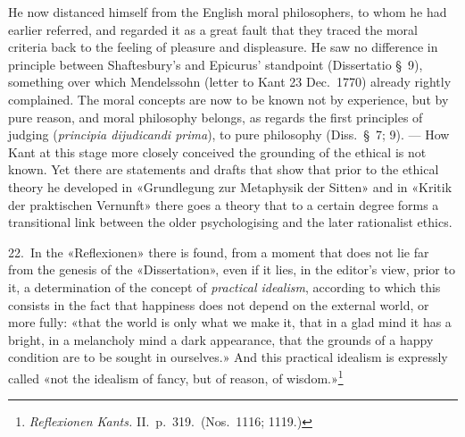 \documentclass[12pt,a4paper]{article}
\newcommand{\opage}[1]{\marginnote{\footnotesize\textit{[#1]}}}
\begin{document}
He now distanced himself from the English moral philosophers, to whom he had
earlier referred, and regarded it as a great fault that they traced the
moral criteria back to the feeling of pleasure and displeasure. He saw no
difference in principle between Shaftesbury's and Epicurus' standpoint
(Dissertatio §\ 9), something over which Mendelssohn (letter to Kant 23
Dec.\ 1770) already rightly complained. The moral concepts are now to be
known not \opage{42}by experience, but by pure reason, and moral philosophy belongs,
as regards the first principles of judging (\textit{principia dijudicandi
prima}), to pure philosophy (Diss.\ §\ 7; 9). --- How Kant at this stage
more closely conceived the grounding of the ethical is not known. Yet there
are statements and drafts that show that prior to the ethical theory he
developed in «Grundlegung zur Metaphysik der Sitten» and in «Kritik der
praktischen Vernunft» there goes a theory that to a certain degree forms a
transitional link between the older psychologising and the later
rationalist ethics.

22.\ In the «Reflexionen» there is found, from a moment that does not lie far
from the genesis of the «Dissertation», even if it lies, in the editor's
view, prior to it, a determination of the concept of \emph{practical idealism},
according to which this consists in the fact that happiness does not depend
on the external world, or more fully: «that the world is only what we make
it, that in a glad mind it has a bright, in a melancholy mind a dark
appearance, that the grounds of a happy condition are to be sought in
ourselves.» And this practical idealism is expressly called «not the
idealism of fancy, but of reason, of wisdom.»\footnote{\textit{Reflexionen
Kants.} II.\ p.\ 319.\ (Nos.\ 1116; 1119.)}
\end{document}
